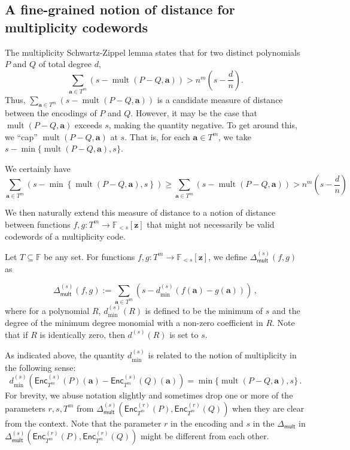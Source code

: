 \documentclass{theoretics}
\def\Field{\mathbb{F}}
\let\F\Field
\def\veca{\mathbf{a}}
\def\vecz{\mathbf{z}}
\newcommand{\enc}{{\mathsf{Enc}}}
\newcommand{\mult}{\operatorname{mult}}
\newcommand{\Delm}{\Delta_{\mathsf{mult}}}
\newcommand{\vz}{\vecz}
\newcommand{\va}{\veca}
\begin{document}
	\subsection{A fine-grained notion of distance for multiplicity codewords}
	The multiplicity Schwartz-Zippel lemma states that for two distinct polynomials $P$ and $Q$ of total degree $d$, 
	\[ \sum_{\va \in T^m} (s-\mult(P-Q, \va)) > n^m \left( s- \frac{d}{n} \right).\]
	Thus, $\sum_{\va \in T^m} {(s-\mult(P-Q, \va))}$ is a candidate
	measure of distance between the encodings of $P$ and $Q$. However, it may be the case that
	$\mult(P-Q, \va)$ exceeds $s$, making the quantity negative. To get around this, we ``cap'' 
	$\mult(P-Q, \va)$ at $s$. That is, for each $\va \in T^m$, we take $s - \min\{\mult(P-Q, \va), s\}$.
	
	We certainly have 
	\[ \sum_{\va \in T^m}(s - \min\left\{\mult(P-Q, \va), s\right\}) \geq  \sum_{\va \in T^m} (s-\mult(P-Q, \va)) > n^m \left( s- \frac{d}{n} \right) \]
	
	We then naturally extend this measure of distance to a notion of
	distance between functions $f, g \colon T^{m} \to \F_{<s}[\vz]$ that might not necessarily be valid codewords of a multiplicity code. 
	\begin{definition}\label{def:SZ distance}
		Let $T\subseteq \F$ be any set. For functions $f, g \colon T^m \to \F_{<s}[\vz]$, we define $\Delta_{\mathsf{mult}}^{(s)} (f, g)$  as
		
		\[ \Delta_{\mathsf{mult}}^{(s)} (f, g) := \sum_{\va \in T^m} (s - d^{(s)}_{\min}(f(\va) - g(\va)))\, ,\]
		where 
		for a polynomial $R$, $d^{(s)}_{\min}(R)$ is defined
		to be the minimum of $s$ and the degree of the minimum degree monomial
		with a non-zero coefficient in $R$. Note that if $R$ is identically
		zero, then $d^{(s)}(R)$ is set to $s$.
	\end{definition}
	
	As indicated above, the quantity $d^{(s)}_{\min}$ is related to the notion of multiplicity in the following sense: 
	\[
	d^{(s)}_{\min}(\enc_{T^m}^{(s)}(P)(\va) -\enc_{T^m}^{(s)}(Q)(\va)) = \min\{\mult(P-Q, \va), s\}\, .
	\]
	For brevity, we abuse notation slightly and sometimes drop one or more of the parameters $r, s, T^m$ from $\Delm^{(s)}(\enc_{T^m}^{(r)}(P),\enc_{T^m}^{(r)}(Q))$ when they are clear from the context. Note that the parameter $r$ in the encoding and $s$ in the $\Delm$ in $\Delm^{(s)}(\enc_{T^m}^{(r)}(P),\enc_{T^m}^{(r)}(Q))$ might be different from each other. 
	
\end{document}
